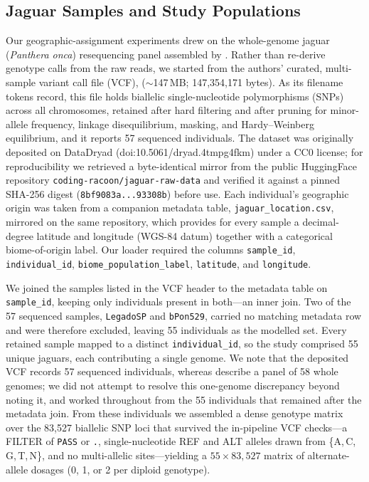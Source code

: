 \documentclass[twocolumn,10pt]{article}
\begin{document}
\subsection{Jaguar Samples and Study Populations}
Our geographic-assignment experiments drew on the whole-genome jaguar (\textit{Panthera onca})
resequencing panel assembled by \citet{lazzari2025development}. Rather than re-derive genotype calls
from the raw reads, we started from the authors' curated, multi-sample variant call file (VCF),
\texttt{}
($\sim$147\,MB; 147{,}354{,}171 bytes). As its filename tokens record, this file holds biallelic
single-nucleotide polymorphisms (SNPs) across all chromosomes, retained after hard filtering and
after pruning for minor-allele frequency, linkage disequilibrium, masking, and Hardy--Weinberg
equilibrium, and it reports 57 sequenced individuals. The dataset was originally deposited on
DataDryad (doi:10.5061/dryad.4tmpg4fkm) under a CC0 license; for reproducibility we retrieved a
byte-identical mirror from the public HuggingFace repository \texttt{coding-racoon/jaguar-raw-data}
and verified it against a pinned SHA-256 digest (\texttt{8bf9083a...93308b}) before use. Each
individual's geographic origin was taken from a companion metadata table,
\texttt{jaguar\_location.csv}, mirrored on the same repository, which provides for every sample a
decimal-degree latitude and longitude (WGS-84 datum) together with a categorical biome-of-origin
label. Our loader required the columns \texttt{sample\_id}, \texttt{individual\_id},
\texttt{biome\_population\_label}, \texttt{latitude}, and \texttt{longitude}.

We joined the samples listed in the VCF header to the metadata table on \texttt{sample\_id}, keeping
only individuals present in both---an inner join. Two of the 57 sequenced samples, \texttt{LegadoSP}
and \texttt{bPon529}, carried no matching metadata row and were therefore excluded, leaving 55
individuals as the modelled set. Every retained sample mapped to a distinct \texttt{individual\_id},
so the study comprised 55 unique jaguars, each contributing a single genome. We note that the
deposited VCF records 57 sequenced individuals, whereas \citet{lazzari2025development} describe a
panel of 58 whole genomes; we did not attempt to resolve this one-genome discrepancy beyond noting
it, and worked throughout from the 55 individuals that remained after the metadata join. From these
individuals we assembled a dense genotype matrix over the 83{,}527 biallelic SNP loci that survived
the in-pipeline VCF checks---a FILTER of \texttt{PASS} or \texttt{.}, single-nucleotide REF and ALT
alleles drawn from \{A,\,C,\,G,\,T,\,N\}, and no multi-allelic sites---yielding a $55 \times
83{,}527$ matrix of alternate-allele dosages (0, 1, or 2 per diploid genotype).
\end{document}
